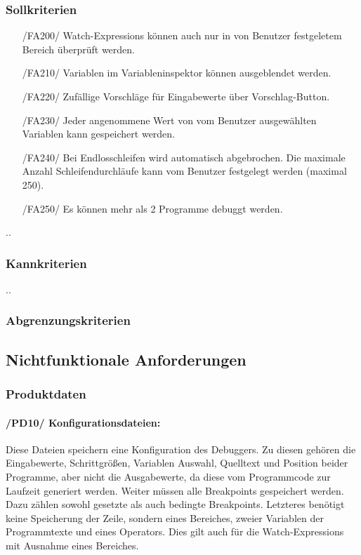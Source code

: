 \documentclass[parskip=full]{scrartcl}
\begin{document}
 		\subsubsection{Sollkriterien}
		\begin{itemize}
		\item[/FA200/] Watch-Expressions können auch nur in von Benutzer festgeletem Bereich überprüft werden.
		\item[/FA210/] Variablen im Variableninspektor können ausgeblendet werden.
		\item[/FA220/] Zufällige Vorschläge für Eingabewerte über Vorschlag-Button.
		\item[/FA230/] Jeder angenommene Wert von vom Benutzer ausgewählten Variablen kann gespeichert werden.
		\item[/FA240/] Bei Endlosschleifen wird automatisch abgebrochen. Die maximale Anzahl Schleifendurchläufe kann vom Benutzer festgelegt werden (maximal 250).
		\item[/FA250/] Es können mehr als 2 Programme debuggt werden.
		\end{itemize}
		..
 		\subsubsection{Kannkriterien}
 		..
 		\subsubsection{Abgrenzungskriterien}
	\subsection{Nichtfunktionale Anforderungen}
		\subsubsection{Produktdaten}
			\paragraph{/PD10/ Konfigurationsdateien:}
			Diese Dateien speichern eine Konfiguration des Debuggers.
			Zu diesen gehören die Eingabewerte, Schrittgrößen, Variablen Auswahl, 						Quelltext und Position beider Programme, aber nicht die Ausgabewerte, da diese 			vom Programmcode zur Laufzeit generiert werden.
			Weiter müssen alle Breakpoints gespeichert werden. Dazu zählen sowohl gesetzte 			als auch bedingte Breakpoints. Letzteres benötigt keine Speicherung der Zeile, 			sondern eines Bereiches, zweier Variablen der Programmtexte und eines Operators. 				Dies gilt auch für die Watch-Expressions mit Ausnahme eines Bereiches.
\end{document}
